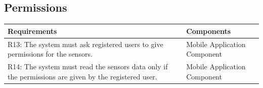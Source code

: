 \subsection{Permissions}
\begin{table}[ht]
\begin{tabular}{|p{9cm}|p{6cm}|}
\hline
\textbf{Requirements}      & \multicolumn{1}{l|}{\textbf{Components}}\\ \hline
R13: The system must ask registered users to give permissions for the sensors. 
&
Mobile Application Component
\\ \hline
R14: The system must read the sensors data only if the permissions are given by the registered user.  
&
Mobile Application Component
\\ \hline
\end{tabular}
\end{table}
\newpage
